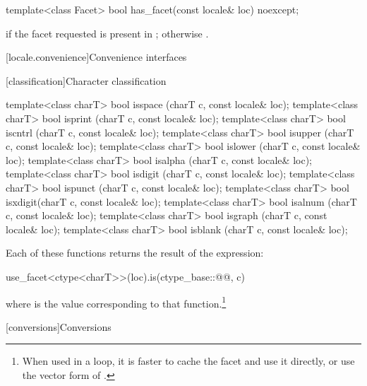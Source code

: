 %
\begin{itemdecl}
template<class Facet> bool has_facet(const locale& loc) noexcept;
\end{itemdecl}

\begin{itemdescr}
\pnum
\returns
{} if the facet requested is present in ; otherwise .
\end{itemdescr}

[locale.convenience]{Convenience interfaces}

[classification]{Character classification}

%
%
%
%
%
%
%
%
%
%
%
%
\begin{itemdecl}
template<class charT> bool isspace (charT c, const locale& loc);
template<class charT> bool isprint (charT c, const locale& loc);
template<class charT> bool iscntrl (charT c, const locale& loc);
template<class charT> bool isupper (charT c, const locale& loc);
template<class charT> bool islower (charT c, const locale& loc);
template<class charT> bool isalpha (charT c, const locale& loc);
template<class charT> bool isdigit (charT c, const locale& loc);
template<class charT> bool ispunct (charT c, const locale& loc);
template<class charT> bool isxdigit(charT c, const locale& loc);
template<class charT> bool isalnum (charT c, const locale& loc);
template<class charT> bool isgraph (charT c, const locale& loc);
template<class charT> bool isblank (charT c, const locale& loc);
\end{itemdecl}

\pnum
Each of these functions
returns the result of the expression:
\begin{codeblock}
use_facet<ctype<charT>>(loc).is(ctype_base::@@, c)
\end{codeblock}
where  is the
value corresponding to that function.\footnote{When
used in a loop, it is faster to cache the
facet and use it directly, or use the vector form of
.}

[conversions]{Conversions}

